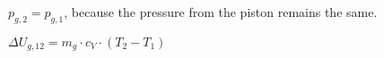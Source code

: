 \( p_{g,2} = p_{g,1} \), because the pressure from the piston remains the same.  

\( \Delta U_{g,12} = m_g \cdot c_V \cdot (T_2 - T_1) \)